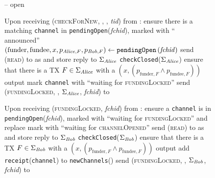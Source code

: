 \begin{figure}[H]
\begin{systembox}{\fpaynet{} -- open}
\begin{algorithmic}[1]
      \State Upon receiving (\textsc{checkForNew}, \alice, \bob, \textit{tid})
      from \alice:
      \Indent
        \State ensure there is a matching \texttt{channel} in
        \texttt{pendingOpen}(\textit{fchid}), marked with ``\alice{}
        announced''
        \label{alg:fpaynet:checkForNew:valid}
        \State $\left(\mathrm{funder}, \mathrm{fundee}, x, p_{\mathit{Alice}, F},
        p_{\mathit{Bob}, F}\right) \gets
        \mathtt{pendingOpen}\left(\mathit{fchid}\right)$
        \State send (\textsc{read}) to \ledger{} as \alice{} and store reply
        to $\Sigma_{\mathit{Alice}}$
        \State \texttt{checkClosed}($\Sigma_{\mathit{Alice}}$)
        \label{alg:fpaynet:checkForNew:read:alice}
        \State ensure that there is a TX $F \in \Sigma_{\mathit{Alice}}$ with a
        $\left(x, \left(p_{\mathrm{funder}, F} \wedge p_{\mathrm{fundee},
        F}\right)\right)$ output
        \label{alg:fpaynet:checkForNew:included}
        \State mark \texttt{channel} with ``waiting for
        \textsc{fundingLocked}''
        \label{alg:fpaynet:checkForNew:mark}
        \State send (\textsc{fundingLocked}, \alice, $\Sigma_{\mathit{Alice}}$,
        \textit{fchid}) to \simulator
        \label{alg:fpaynet:checkForNew:sim}
      \EndIndent
      \Statex

      \State Upon receiving (\textsc{fundingLocked}, \textit{fchid}) from
      \simulator:
      \Indent
        \State ensure a \texttt{channel} is in
        \texttt{pendingOpen}(\textit{fchid}), marked with ``waiting for
        \textsc{fundingLocked}'' and replace mark with ``waiting for
        \textsc{channelOpened}''
        \State send (\textsc{read}) to \ledger{} as \bob{} and store reply
        to $\Sigma_{\mathit{Bob}}$
        \State \texttt{checkClosed}($\Sigma_{\mathit{Bob}}$)
        \label{alg:fpaynet:checkForNew:read:bob}
        \State ensure that there is a TX $F \in \Sigma_{\mathit{Bob}}$ with a
        $\left(x, \left(p_{\mathrm{funder}, F} \wedge p_{\mathrm{fundee},
        F}\right)\right)$ output
        \State add \texttt{receipt}(\texttt{channel}) to
        \texttt{newChannels}(\bob)
        \label{alg:fpaynet:fundingLocked:report}
        \State send (\textsc{fundingLocked}, \bob, $\Sigma_{\mathit{Bob}}$,
        \textit{fchid}) to \simulator
        \label{alg:fpaynet:fundingLocked:sim}
      \EndIndent
      \Statex


\end{algorithmic}
\end{systembox}
\end{figure}
